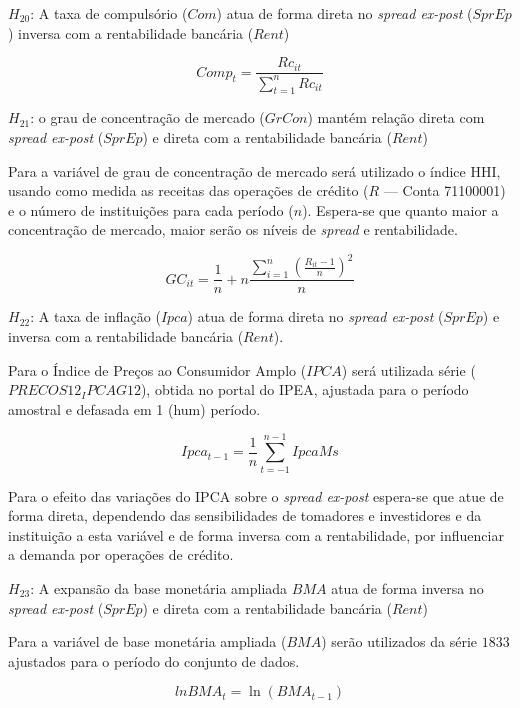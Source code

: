\documentclass[
  12pt,
  12pt,
  openright,
  oneside,
  a4paper,
  chapter=TITLE,
  section=TITLE,
  subsection=TITLE,
  subsubsection=TITLE,
  english,
  portugues,
  sumario=tradicional]{abntex2}
\begin{document}
\(H_{20}\): A taxa de compulsório (\(Com\)) atua de forma direta no \emph{spread ex-post} (\(SprEp\)) inversa com a rentabilidade bancária (\(Rent\))

\begin{equation}
Comp_{t} = \frac{Rc_{it}}{\sum_{t=1}^{n}Rc_{it}}
\end{equation}

\(H_{21}\): o grau de concentração de mercado (\(GrCon\)) mantém relação direta com \emph{spread ex-post} (\(SprEp\)) e direta com a rentabilidade bancária (\(Rent\))

Para a variável de grau de concentração de mercado será utilizado o índice HHI, usando como medida as receitas das operações de crédito (\(R\) --- Conta 71100001) e o número de instituições para cada período (\(n\)). Espera-se que quanto maior a concentração de mercado, maior serão os níveis de \emph{spread} e rentabilidade.

\begin{equation}
GC_{it} = \frac{1}{n} + n\frac{\sum_{i=1}^{n}(\frac{R_{it} - 1}{n})^2}{n}
\end{equation}

\(H_{22}\): A taxa de inflação (\(Ipca\)) atua de forma direta no \emph{spread ex-post} (\(SprEp\)) e inversa com a rentabilidade bancária (\(Rent\)).

Para o Índice de Preços ao Consumidor Amplo (\(IPCA\)) será utilizada série (\(PRECOS12_IPCAG12\)), obtida no portal do IPEA, ajustada para o período amostral e defasada em 1 (hum) período.

\begin{equation}
Ipca_{t-1} = \frac{1}{n}\sum_{t=-1}^{n-1}IpcaMs
\end{equation}

Para o efeito das variações do IPCA sobre o \emph{spread ex-post} espera-se que atue de forma direta, dependendo das sensibilidades de tomadores e investidores e da instituição a esta variável e de forma inversa com a rentabilidade, por influenciar a demanda por operações de crédito.

\(H_{23}\): A expansão da base monetária ampliada \(BMA\) atua de forma inversa no \emph{spread ex-post} (\(SprEp\)) e direta com a rentabilidade bancária (\(Rent\))

Para a variável de base monetária ampliada (\(BMA\)) serão utilizados da série \(1833\) ajustados para o período do conjunto de dados.

\begin{equation}
lnBMA_{t} = \ln(BMA_{t-1})
\end{equation}
\end{document}
